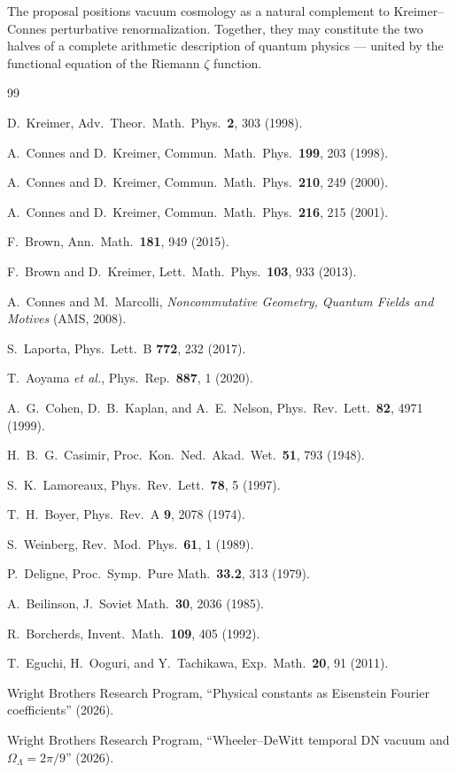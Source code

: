 \documentclass[11pt,a4paper]{article}
\begin{document}
The proposal positions vacuum cosmology as a natural complement
to Kreimer--Connes perturbative renormalization. Together, they
may constitute the two halves of a complete arithmetic description
of quantum physics --- united by the functional equation of the
Riemann $\zeta$ function.

\begin{thebibliography}{99}

D.~Kreimer, Adv.\ Theor.\ Math.\ Phys.\ \textbf{2}, 303 (1998).

A.~Connes and D.~Kreimer,
Commun.\ Math.\ Phys.\ \textbf{199}, 203 (1998).

A.~Connes and D.~Kreimer,
Commun.\ Math.\ Phys.\ \textbf{210}, 249 (2000).

A.~Connes and D.~Kreimer,
Commun.\ Math.\ Phys.\ \textbf{216}, 215 (2001).

F.~Brown, Ann.\ Math.\ \textbf{181}, 949 (2015).

F.~Brown and D.~Kreimer,
Lett.\ Math.\ Phys.\ \textbf{103}, 933 (2013).

A.~Connes and M.~Marcolli, \textit{Noncommutative Geometry,
Quantum Fields and Motives} (AMS, 2008).

S.~Laporta, Phys.\ Lett.\ B \textbf{772}, 232 (2017).

T.~Aoyama \textit{et al.},
Phys.\ Rep.\ \textbf{887}, 1 (2020).

A.~G.~Cohen, D.~B.~Kaplan, and A.~E.~Nelson,
Phys.\ Rev.\ Lett.\ \textbf{82}, 4971 (1999).

H.~B.~G.~Casimir,
Proc.\ Kon.\ Ned.\ Akad.\ Wet.\ \textbf{51}, 793 (1948).

S.~K.~Lamoreaux,
Phys.\ Rev.\ Lett.\ \textbf{78}, 5 (1997).

T.~H.~Boyer, Phys.\ Rev.\ A \textbf{9}, 2078 (1974).

S.~Weinberg, Rev.\ Mod.\ Phys.\ \textbf{61}, 1 (1989).

P.~Deligne, Proc.\ Symp.\ Pure Math.\ \textbf{33.2}, 313 (1979).

A.~Beilinson, J.\ Soviet Math.\ \textbf{30}, 2036 (1985).

R.~Borcherds, Invent.\ Math.\ \textbf{109}, 405 (1992).

T.~Eguchi, H.~Ooguri, and Y.~Tachikawa,
Exp.\ Math.\ \textbf{20}, 91 (2011).

Wright Brothers Research Program,
``Physical constants as Eisenstein Fourier coefficients'' (2026).

Wright Brothers Research Program,
``Wheeler--DeWitt temporal DN vacuum and
$\Omega_\Lambda = 2\pi/9$'' (2026).

\end{thebibliography}
\end{document}
